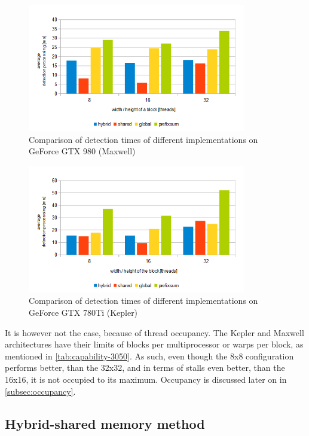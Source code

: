 \begin{figure}
	\label{fig:980-det-measurement}
	\centering\includegraphics[width=0.85\textwidth]{fig/1080_detection_maxwell.png}
	\caption{Comparison of detection times of different implementations on GeForce GTX 980 (Maxwell)}
\end{figure}

\begin{figure}
	\label{fig:780ti-det-measurement}
	\centering\includegraphics[width=0.85\textwidth]{fig/1080_detection_kepler.png}
	\caption{Comparison of detection times of different implementations on GeForce GTX 780Ti (Kepler)}
\end{figure}

It is however not the case, because of thread occupancy. The Kepler and Maxwell architectures have their limits of blocks per multiprocessor or warps per block, as mentioned in \ref{tab:capability-3050}. As such, even though the 8x8 configuration performs better, than the 32x32, and in terms of stalls even better, than the 16x16, it is not occupied to its maximum. Occupancy is discussed later on in \ref{subsec:occupancy}.

\subsection{Hybrid-shared memory method}

